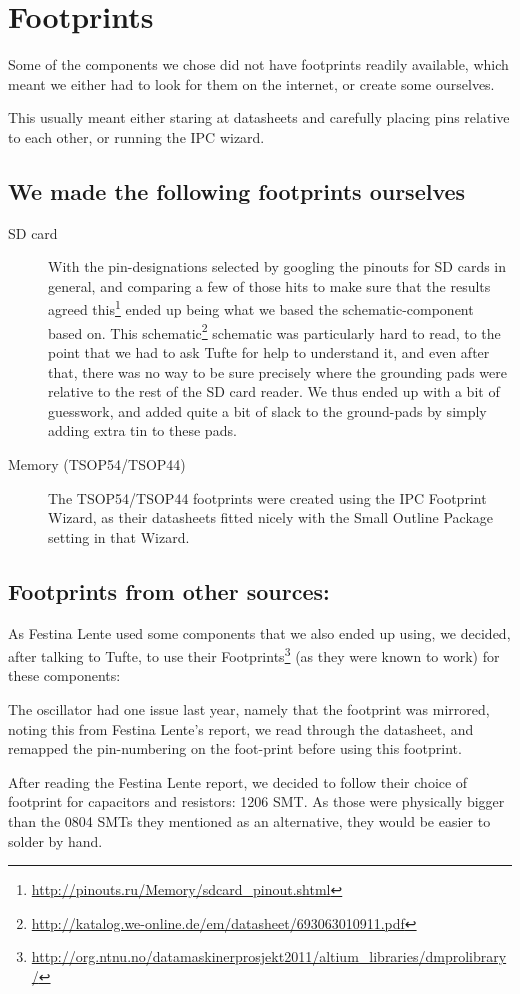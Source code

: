 \section {Footprints}
Some of the components we chose did not have footprints readily available, which
meant we either had to look for them on the internet, or create some ourselves.

This usually meant either staring at datasheets and carefully placing pins
relative to each other, or running the IPC wizard.

\subsection{We made the following footprints ourselves}

\begin{description}
\item[SD card] With the pin-designations selected by googling the pinouts for
  \ac{SD} cards in general, and comparing a few of those hits to make sure that
  the results agreed
  this\footnote{\url{http://pinouts.ru/Memory/sdcard_pinout.shtml}} ended up
  being what we based the schematic-component based on. This
  schematic\footnote{\url{http://katalog.we-online.de/em/datasheet/693063010911.pdf}}
  schematic was particularly hard to read, to the point that we had to ask Tufte
  for help to understand it, and even after that, there was no way to be sure
  precisely where the grounding pads were relative to the rest of the \ac{SD}
  card reader. We thus ended up with a bit of guesswork, and added quite a bit
  of slack to the ground-pads by simply adding extra tin to these pads.
\item[Memory (TSOP54/TSOP44)] The TSOP54/TSOP44 footprints were created using
  the IPC Footprint Wizard, as their datasheets fitted nicely with the Small
  Outline Package setting in that Wizard.
\end{description}

\subsection{Footprints from other sources:}
As Festina Lente used some components that we also ended up using, we decided,
after talking to Tufte, to use their Footprints\footnote{\url{http://org.ntnu.no/datamaskinerprosjekt2011/altium_libraries/dmprolibrary/}}
(as they were known to work) for these components:


The oscillator had one issue last year, namely that the
footprint was mirrored, noting this from Festina Lente's report, we read
through the datasheet, and remapped the pin-numbering on the foot-print 
before using this footprint.

After reading the Festina Lente report\cite{berg2011festinalente}, we decided to
follow their choice of footprint for capacitors and resistors: 1206 SMT. As
those were physically bigger than the 0804 SMTs they mentioned as an
alternative, they would be easier to solder by hand.
